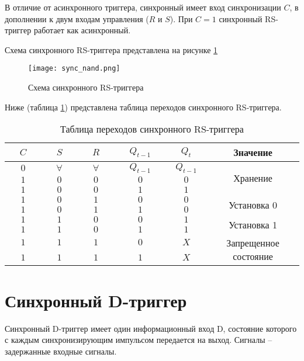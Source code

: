 В отличие от асинхронного триггера, синхронный имеет вход синхронизации $C$, в дополнении к двум входам управления ($R$ и $S$). При $C = 1$ синхронный RS-триггер работает как асинхронный.

Схема синхронного RS-триггера представлена на рисунке \ref{sync-rs}

\begin{figure}
	\centering
	\texttt{[image: sync\_nand.png]}
	\caption{Схема синхронного RS-триггера}
	\label{sync-rs}
\end{figure}

Ниже (таблица \ref{sync-rs-table}) представлена таблица переходов синхронного RS-триггера.

\begin{table}
	\centering
	\caption{Таблица переходов синхронного RS-триггера}
	\begin{tabular}{|c|c|c|c|c|c|}
		\hline
		$~~~~~C~~~~~$ & $~~~~~S~~~~~$ & $~~~~~R~~~~~$ & $~~~~~Q_{t-1}~~~~~$ & $~~~~~Q_t~~~~~$ & Значение \\
		\hline
		$0$ & $\forall$ & $\forall$ & $Q_{t-1}$ & $Q_{t-1}$ & \multirow{3}{*}{Хранение} \\
		\cline{1-5}
		$1$ & $0$ & $0$ & $0$ & $0$ & \\
		\cline{1-5}
		$1$ & $0$ & $0$ & $1$ & $1$ & \\
		\hline
		$1$ & $0$ & $1$ & $0$ & $0$ &  \multirow{2}{*}{Установка 0} \\
		\cline{1-5}
		$1$ & $0$ & $1$ & $1$ & $0$ & \\
		\hline
		$1$ & $1$ & $0$ & $0$ & $1$ &  \multirow{2}{*}{Установка 1} \\
		\cline{1-5}
		$1$ & $1$ & $0$ & $1$ & $1$ & \\
		\hline
		$1$ & $1$ & $1$ & $0$ & $X$ &  \multirow{2}{*}{Запрещенное состояние} \\
		\cline{1-5}
		$1$ & $1$ & $1$ & $1$ & $X$ & \\
		\hline
	\end{tabular}
	\label{sync-rs-table}
\end{table}

\pagebreak

\section{Синхронный D-триггер}

Синхронный D-триггер имеет один информационный вход D, состояние которого с каждым синхронизирующим импульсом передается на выход. Сигналы -- задержанные входные сигналы.

